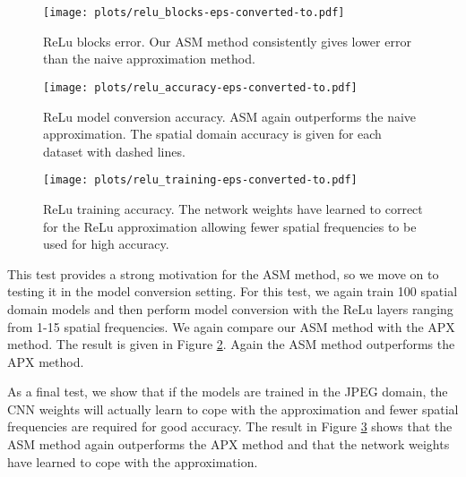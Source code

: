 \documentclass[10pt,twocolumn,letterpaper]{article}
\begin{document}
\begin{figure*}
    \centering
    \caption{ReLu accuracy results.}
    \begin{subfigure}{0.33\textwidth}
        \captionsetup{width=.8\linewidth}
        \centering
        \texttt{[image: plots/relu\_blocks-eps-converted-to.pdf]}
        \caption{ReLu blocks error. Our ASM method consistently gives lower error than the naive approximation method.}
        \label{fig:rba}
    \end{subfigure}%
    \begin{subfigure}{0.33\textwidth}
        \captionsetup{width=.8\linewidth}
        \centering
        \texttt{[image: plots/relu\_accuracy-eps-converted-to.pdf]}
        \caption{ReLu model conversion accuracy. ASM again outperforms the naive approximation. The spatial domain accuracy is given for each dataset with dashed lines.}
        \label{fig:ra}
    \end{subfigure}%
    \begin{subfigure}{0.33\textwidth}
        \captionsetup{width=.8\linewidth}
        \centering
        \texttt{[image: plots/relu\_training-eps-converted-to.pdf]}
        \caption{ReLu training accuracy. The network weights have learned to correct for the ReLu approximation allowing fewer spatial frequencies to be used for high accuracy.}
        \label{fig:rt}
    \end{subfigure}
\end{figure*}

This test provides a strong motivation for the ASM method, so we move on to testing it in the model conversion setting. For this test, we again train 100 spatial domain models and then perform model conversion with the ReLu layers ranging from 1-15 spatial frequencies. We again compare our ASM method with the APX method. The result is given in Figure \ref{fig:ra}. Again the ASM method outperforms the APX method.



As a final test, we show that if the models are trained in the JPEG domain, the CNN weights will actually learn to cope with the approximation and fewer spatial frequencies are required for good accuracy. The result in Figure \ref{fig:rt} shows that the ASM method again outperforms the APX method and that the network weights have learned to cope with the approximation.
\end{document}
